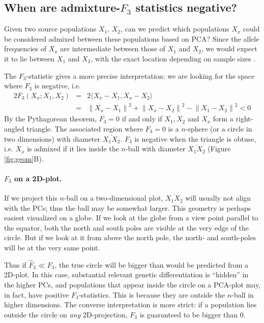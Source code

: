 \documentclass[12pt,fullpage, a4paper]{article}
\newcommand{\normsq}[1]{\left\lVert#1\right\rVert^2}
\begin{document}
\subsection{When are admixture-$F_3$ statistics negative?}
Given two source populations $X_1$, $X_2$, can we predict which populations $X_x$ could be considered admixed between these populations based on PCA? Since the allele frequencies of $X_x$ are intermediate between those of $X_1$ and $X_2$, we would expect it to lie between $X_1$ and $X_2$, with the exact location depending on sample sizes \citep{brisbin2012, mcvean2009}. 

The $F_3$-statistic gives a more precise interpretation: we are looking for the space where $F_3$ is negative, i.e. 
\begin{eqnarray}
2 F_3(X_x; X_1, X_2) &=& 2\langle  X_x - X_1, X_x - X_2 \rangle \nonumber\\
      &=& \normsq{X_x - X_1} + \normsq{X_x - X_2}  - \normsq{X_1 - X_2} < 0
\end{eqnarray}
By the Pythagorean theorem, $F_3 = 0 $ if and only if $X_1, X_2$ and $X_x$ form a right-angled triangle. The associated region where $F_3=0$ is a $n$-sphere (or a circle in two dimensions) with diameter $\overline{X_1X_2}$. $F_3$ is negative when the triangle is obtuse, i.e. $X_x$ is admixed if it lies inside the $n$-ball with diameter $\overline{X_1X_2}$ (Figure \ref{fig:geom}B). 

\paragraph{$F_3$ on a 2D-plot.} 
 If we project this $n$-ball on a two-dimensional plot, $\overline{X_1X_2}$ will usually not align with the PCs; thus the ball may be somewhat larger. This geometry is perhaps easiest visualized on a globe. If we look at the globe from a view point parallel to the equator, both the north and south poles are visible at the very edge of the circle. But if we look at it from above the north pole, the north- and south-poles will be at the very same point.
 
 Thus if $\hat{F}_3 \ll F_3$, the true circle will be bigger than would be predicted from a 2D-plot. In this case, substantial relevant genetic differentiation is ``hidden'' in the higher PCs, and populations that appear inside the circle on a PCA-plot may, in fact, have positive $F_3$-statistics. This is because they are outside the $n$-ball in higher dimensions. The converse interpretation is more strict: if a population lies outside the circle on \emph{any} 2D-projection, $F_3$ is guaranteed to be bigger than 0.
\end{document}
